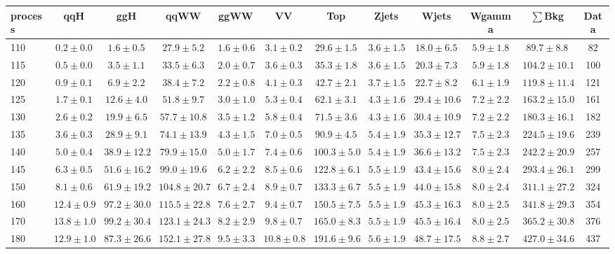\begin{table}
{%
 \tiny
 \begin{center}
 \begin{tabular}{l | c c | c c c c c c c | c c}
 \hline
 process & qqH & ggH & qqWW & ggWW & VV & Top & Zjets & Wjets & Wgamma & $\sum$Bkg & Data \\
 \hline
110 & $0.2\pm0.0$ & $1.6\pm0.5$ & $27.9\pm5.2$ & $1.6\pm0.6$ & $3.1\pm0.2$ & $29.6\pm1.5$ & $3.6\pm1.5$ & $18.0\pm6.5$ & $5.9\pm1.8$ & $89.7\pm8.8$ & 82 \\
115 & $0.5\pm0.0$ & $3.5\pm1.1$ & $33.5\pm6.3$ & $2.0\pm0.7$ & $3.6\pm0.3$ & $35.3\pm1.8$ & $3.6\pm1.5$ & $20.3\pm7.3$ & $5.9\pm1.8$ & $104.2\pm10.1$ & 100 \\
120 & $0.9\pm0.1$ & $6.9\pm2.2$ & $38.4\pm7.2$ & $2.2\pm0.8$ & $4.1\pm0.3$ & $42.7\pm2.1$ & $3.7\pm1.5$ & $22.7\pm8.2$ & $6.1\pm1.9$ & $119.8\pm11.4$ & 121 \\
125 & $1.7\pm0.1$ & $12.6\pm4.0$ & $51.8\pm9.7$ & $3.0\pm1.0$ & $5.3\pm0.4$ & $62.1\pm3.1$ & $4.3\pm1.6$ & $29.4\pm10.6$ & $7.2\pm2.2$ & $163.2\pm15.0$ & 161 \\
130 & $2.6\pm0.2$ & $19.9\pm6.5$ & $57.7\pm10.8$ & $3.5\pm1.2$ & $5.8\pm0.4$ & $71.5\pm3.6$ & $4.3\pm1.6$ & $30.4\pm10.9$ & $7.2\pm2.2$ & $180.3\pm16.1$ & 182 \\
135 & $3.6\pm0.3$ & $28.9\pm9.1$ & $74.1\pm13.9$ & $4.3\pm1.5$ & $7.0\pm0.5$ & $90.9\pm4.5$ & $5.4\pm1.9$ & $35.3\pm12.7$ & $7.5\pm2.3$ & $224.5\pm19.6$ & 239 \\
140 & $5.0\pm0.4$ & $38.9\pm12.2$ & $79.9\pm15.0$ & $5.0\pm1.7$ & $7.4\pm0.6$ & $100.3\pm5.0$ & $5.4\pm1.9$ & $36.6\pm13.2$ & $7.5\pm2.3$ & $242.2\pm20.9$ & 257 \\
145 & $6.3\pm0.5$ & $51.6\pm16.2$ & $99.0\pm19.6$ & $6.2\pm2.2$ & $8.5\pm0.6$ & $122.8\pm6.1$ & $5.5\pm1.9$ & $43.4\pm15.6$ & $8.0\pm2.4$ & $293.4\pm26.1$ & 299 \\
150 & $8.1\pm0.6$ & $61.9\pm19.2$ & $104.8\pm20.7$ & $6.7\pm2.4$ & $8.9\pm0.7$ & $133.3\pm6.7$ & $5.5\pm1.9$ & $44.0\pm15.8$ & $8.0\pm2.4$ & $311.1\pm27.2$ & 324 \\
160 & $12.4\pm0.9$ & $97.2\pm30.0$ & $115.5\pm22.8$ & $7.6\pm2.7$ & $9.4\pm0.7$ & $150.5\pm7.5$ & $5.5\pm1.9$ & $45.3\pm16.3$ & $8.0\pm2.5$ & $341.8\pm29.3$ & 354 \\
170 & $13.8\pm1.0$ & $99.2\pm30.4$ & $123.1\pm24.3$ & $8.2\pm2.9$ & $9.8\pm0.7$ & $165.0\pm8.3$ & $5.5\pm1.9$ & $45.5\pm16.4$ & $8.0\pm2.5$ & $365.2\pm30.8$ & 376 \\
180 & $12.9\pm1.0$ & $87.3\pm26.6$ & $152.1\pm27.8$ & $9.5\pm3.3$ & $10.8\pm0.8$ & $191.6\pm9.6$ & $5.6\pm1.9$ & $48.7\pm17.5$ & $8.8\pm2.7$ & $427.0\pm34.6$ & 437 \\

\end{tabular}
\end{center}}
\end{table}
